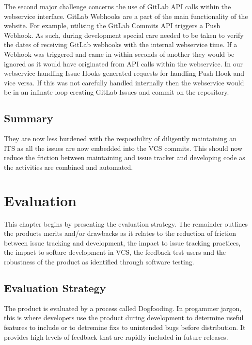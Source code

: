 \documentclass{mproj}
\begin{document}
The second major challenge concerns the use of GitLab API calls within the webservice interface. GitLab Webhooks are a part of the main functionality of the website. For example, utilising the GitLab Commits API triggers a Push Webhook. As such, during development special care needed to be taken to verify the dates of receiving GitLab webhooks with the internal webservice time. If a Webhook was triggered and came in within seconds of another they would be ignored as it would have originated from API calls within the webservice. In our webservice handling Issue Hooks generated requests for handling Push Hook and vice versa. If this was not carefully handled internally then the webservice would be in an infinate loop creating GitLab Issues and commit on the repository.


\section{Summary}

They are now less burdened with the resposibility of diligently maintaining an ITS as all the issues are now embedded into the VCS  commits. This should now reduce the friction between maintaining and issue tracker and developing code as the activities are combined and automated.





\chapter{Evaluation}\label{evaluation}

This chapter begins by presenting the evaluation strategy. The remainder outlines the products merits and/or drawbacks as it relates to the reduction of friction between issue tracking and development, the impact to issue tracking practices, the impact to softare development in VCS, the feedback test users and the robustness of the product as identified through software testing. 

\section{Evaluation Strategy}

The product is evaluated by a process called Dogfooding. In progammer jargon, this is where developers use the product during development to determine useful features to include or to detremine fixs to unintended bugs before distribution. It provides high levels of feedback that are rapidly included in future releases. 
\end{document}
